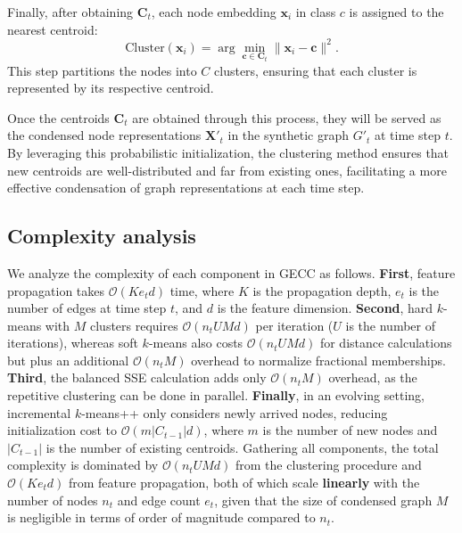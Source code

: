 Finally, after obtaining \( \mathbf{C}_t \), each node embedding \( \mathbf{x}_i \) in class \( c \) is assigned to the nearest centroid:
\[
\text{Cluster}(\mathbf{x}_i) = \arg\min_{\mathbf{c} \in \mathbf{C}_t} \|\mathbf{x}_i - \mathbf{c}\|^2.
\]
This step partitions the nodes into \( C \) clusters, ensuring that each cluster is represented by its respective centroid.

Once the centroids $\mathbf{C}_t$ are obtained through this process, they will be served as the condensed node representations $\mathbf{X}'_t$ in the synthetic graph \( G'_t \) at time step \( t \). By leveraging this probabilistic initialization, the clustering method ensures that new centroids are well-distributed and far from existing ones, facilitating a more effective condensation of graph representations at each time step.

\subsection{Complexity analysis}
We analyze the complexity of each component in \textsc{GECC} as follows.
\textbf{First}, feature propagation takes \(\mathcal{O}(Ke_td)\) time, where \(K\) is the propagation depth, \(e_t\) is the number of edges at time step \(t\), and \(d\) is the feature dimension.
\textbf{Second}, hard \(k\)-means with \(M\) clusters requires \(\mathcal{O}(n_tUMd)\) per iteration (\(U\) is the number of iterations), whereas soft \(k\)-means also costs \(\mathcal{O}(n_tUMd)\) for distance calculations but plus an additional \(\mathcal{O}(n_tM)\) overhead to normalize fractional memberships. 
\textbf{Third}, the balanced SSE calculation adds only \(\mathcal{O}(n_tM)\) overhead, as the repetitive clustering can be done in parallel. 
\textbf{Finally}, in an evolving setting, incremental \(k\)-means++ only considers newly arrived nodes, reducing initialization cost to \(\mathcal{O}(m|C_{t-1}|d)\), where \(m\) is the number of new nodes and \(|C_{t-1}|\) is the number of existing centroids. 
Gathering all components, the total complexity is dominated by \(\mathcal{O}(n_tUMd)\) from the clustering procedure and \(\mathcal{O}(Ke_td)\) from feature propagation, both of which scale \textbf{linearly} with the number of nodes \(n_t\) and edge count \(e_t\), given that the size of condensed graph $M$ is negligible in terms of order of magnitude compared to $n_t$.

